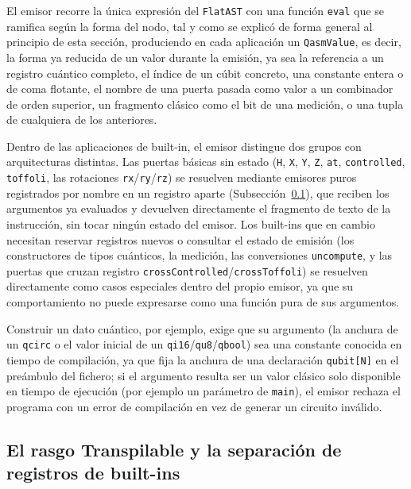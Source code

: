 El emisor recorre la única expresión del \lstinline|FlatAST| con una función \lstinline|eval| que se ramifica según la forma del nodo, tal y como se explicó de forma general al principio de esta sección, produciendo en cada aplicación un \lstinline|QasmValue|, es decir, la forma ya reducida de un valor durante la emisión, ya sea la referencia a un registro cuántico completo, el índice de un cúbit concreto, una constante entera o de coma flotante, el nombre de una puerta pasada como valor a un combinador de orden superior, un fragmento clásico como el bit de una medición, o una tupla de cualquiera de los anteriores.

Dentro de las aplicaciones de built-in, el emisor distingue dos grupos con arquitecturas distintas. Las puertas básicas sin estado (\lstinline|H|, \lstinline|X|, \lstinline|Y|, \lstinline|Z|, \lstinline|at|, \lstinline|controlled|, \lstinline|toffoli|, las rotaciones \lstinline|rx|/\lstinline|ry|/\lstinline|rz|) se resuelven mediante emisores puros registrados por nombre en un registro aparte (Subsección~\ref{sec:transpilable}), que reciben los argumentos ya evaluados y devuelven directamente el fragmento de texto de la instrucción, sin tocar ningún estado del emisor. Los built-ins que en cambio necesitan reservar registros nuevos o consultar el estado de emisión (los constructores de tipos cuánticos, la medición, las conversiones \lstinline|uncompute|, y las puertas que cruzan registro \lstinline|crossControlled|/\lstinline|crossToffoli|) se resuelven directamente como casos especiales dentro del propio emisor, ya que su comportamiento no puede expresarse como una función pura de sus argumentos.

Construir un dato cuántico, por ejemplo, exige que su argumento (la anchura de un \lstinline|qcirc| o el valor inicial de un \lstinline|qi16|/\lstinline|qu8|/\lstinline|qbool|) sea una constante conocida en tiempo de compilación, ya que fija la anchura de una declaración \lstinline|qubit[N]| en el preámbulo del fichero; si el argumento resulta ser un valor clásico solo disponible en tiempo de ejecución (por ejemplo un parámetro de \lstinline|main|), el emisor rechaza el programa con un error de compilación en vez de generar un circuito inválido.

\subsection{El rasgo Transpilable y la separación de registros de built-ins}
\label{sec:transpilable}

